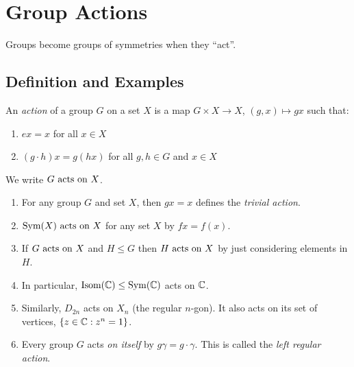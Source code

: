 \documentclass[../main.tex]{subfiles}
\begin{document}
\chapter{Group Actions}
Groups become groups of symmetries when they ``act''.
\section{Definition and Examples}
\begin{definition}
  An \textit{action} of a group $G$ on a set $X$ is a map $G \times X \to X$, $(g, x) \mapsto gx$ such that:
  \begin{enumerate}
    \item $ex = x$ for all $x \in X$
    \item $(g \cdot h)x = g(hx)$ for all $g, h \in G$ and $x \in X$
  \end{enumerate}
  \label{actionDef}
\end{definition}
We write $G \text{ acts on } X$.
\begin{example}
  \label{actionExamples}
  \begin{enumerate}
    \item For any group $G$ and set $X$, then $gx = x$ defines the \textit{trivial action}.
    \item $\operatorname{Sym}(X) \text{ acts on } X$ for any set $X$ by $fx = f(x)$.
    \item If $G \text{ acts on } X$ and $H \leq G$ then $H \text{ acts on } X$ by just considering elements in $H$.
    \item In particular, $\operatorname{Isom}(\mathbb{C}) \leq \operatorname{Sym}(\mathbb{C})$ acts on $\mathbb{C}$.
    \item Similarly, $D_{2n}$ acts on $X_n$ (the regular $n$-gon).
      It also acts on its set of vertices, $\{z \in \mathbb{C} : z^{n} = 1\}$.
    \item Every group $G$ acts \textit{on itself} by $g \gamma = g \cdot \gamma$.
      This is called the \textit{left regular action}.
  \end{enumerate}
\end{example}
\end{document}

